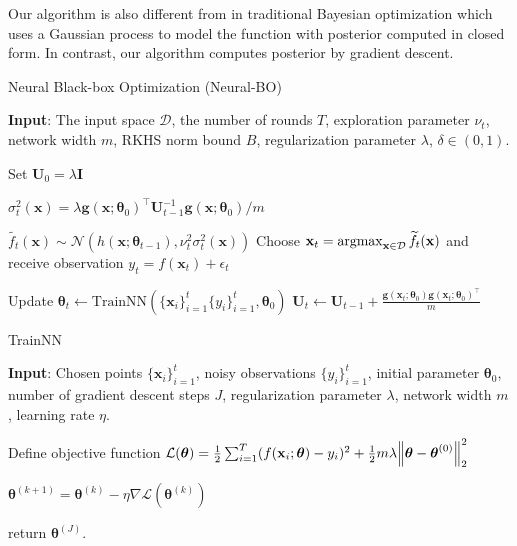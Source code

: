 Our algorithm is also different from \citet{chowdhury2017kernelized} in traditional Bayesian optimization which uses a Gaussian process to model the function with posterior computed in closed form. In contrast, our algorithm computes posterior by gradient descent. 

\begin{algorithm}[]
\caption{Neural Black-box Optimization (Neural-BO)}
\label{alg:Neural-BO}
\textbf{Input}: The input space $\mathcal D$, the number of rounds $T$, exploration parameter $\nu_t$, network width $m$, RKHS norm bound $B$, regularization parameter $\lambda$, $\delta \in (0,1)$.
\begin{algorithmic}[1]
\State Set $\mathbf{U}_0 = \lambda \mathbf{I}$ 

\State $\sigma^2_t (\mathbf{x}) = \lambda \mathbf{g}(\mathbf{x};\boldsymbol{\theta}_0)^\top\mathbf{U}_{t-1}^{-1}\mathbf{g}(\mathbf{x};\boldsymbol{\theta}_0)/m$ \label{line:calculate_var}

\State $\widetilde{f_t}(\mathbf{x}) \sim \mathcal{N}(h(\mathbf{x}; \boldsymbol{\theta}_{t-1}), \nu_t^2 \sigma^2_t(\mathbf{x}))$ 
\State Choose $\mathbf{x}_t = \operatorname*{argmax}_{\mathbf{x} \in \mathcal{D}} \widetilde{f_t}(\mathbf{x}) $ and receive observation $y_t = f(\mathbf{x}_t) + \epsilon_t$ 
   
\State Update $\boldsymbol{\theta}_t \leftarrow \text{TrainNN}(\{\mathbf{x}_i\}^t_{i=1} \{y_i\}^t_{i=1}, \boldsymbol{\theta}_0)$ \label{line:train_NN}
\State $\mathbf{U}_t \leftarrow \mathbf{U}_{t-1} +  \frac{\mathbf{g}(\mathbf{x}_t;\boldsymbol{\theta}_0)\mathbf{g}(\mathbf{x}_t; \boldsymbol{\theta}_0)^\top}{m} $ \label{line:update_Ut}
\EndFor
\end{algorithmic}
\end{algorithm}

\begin{algorithm}[H]
\caption{TrainNN}
\label{alg:train_NN}
\textbf{Input}: Chosen points $\{\mathbf{x}_i\}^t_{i=1}$, noisy observations $\{y_i\}^t_{i=1}$, initial parameter $\boldsymbol{\theta}_0$, number of gradient descent steps $J$, regularization parameter $\lambda$, network width $m$, learning rate $\eta$.
\begin{algorithmic}[1]
\State Define objective function $\mathcal{L}(\boldsymbol{\theta})  = \frac{1}{2}\sum^T_{i=1} (f(\mathbf{x}_i; \boldsymbol{\theta}) - y_i)^2 + \frac{1}{2}m\lambda\norm{\boldsymbol{\theta} - \boldsymbol{\theta}^{(0)}}^2_2$

$\boldsymbol{\theta}^{(k+1)} = \boldsymbol{\theta}^{(k)} - \eta \nabla \mathcal{L}(\boldsymbol{\theta}^{(k)})$
\EndFor

\State return $\boldsymbol{\theta}^{(J)}$.
\end{algorithmic}
\end{algorithm}


